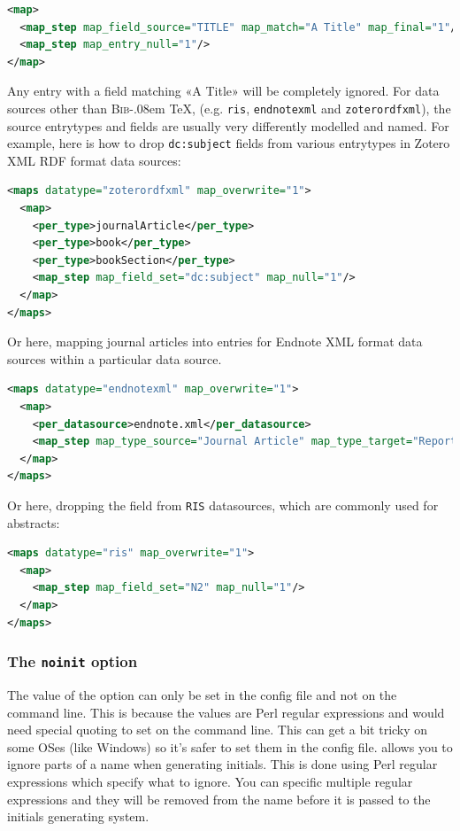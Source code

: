 \documentclass{ltxdockit}
\def\BibTeX{\textsc{Bib}\kern-.08em \TeX}
\begin{document}
\begin{lstlisting}[language=xml,escapechar=;,mathescape=true]
<map>
  <map_step map_field_source="TITLE" map_match="A Title" map_final="1"/>
  <map_step map_entry_null="1"/>
</map>
\end{lstlisting}

\noindent Any entry with a  field matching «A Title»
will be completely ignored.
\bigskip
{}
For data sources other than \BibTeX, (e.g. \verb+ris+, \verb+endnotexml+
and \verb+zoterordfxml+), the source entrytypes and fields are usually very
differently modelled and named. For example, here is how to drop
\verb+dc:subject+ fields from various entrytypes in Zotero XML RDF format data
sources:

\begin{lstlisting}[language=xml,escapechar=+,mathescape=true]
<maps datatype="zoterordfxml" map_overwrite="1">
  <map>
    <per_type>journalArticle</per_type>
    <per_type>book</per_type>
    <per_type>bookSection</per_type>
    <map_step map_field_set="dc:subject" map_null="1"/>
  </map>
</maps>
\end{lstlisting}

\noindent Or here, mapping journal articles into  entries for
Endnote XML format data sources within a particular data source.

\begin{lstlisting}[language=xml,escapechar=+,mathescape=true]
<maps datatype="endnotexml" map_overwrite="1">
  <map>
    <per_datasource>endnote.xml</per_datasource>
    <map_step map_type_source="Journal Article" map_type_target="Report"/>
  </map>
</maps>
\end{lstlisting}

\noindent Or here, dropping the  field from \verb+RIS+
datasources, which are commonly used for abstracts:

\begin{lstlisting}[language=xml,escapechar=+,mathescape=true]
<maps datatype="ris" map_overwrite="1">
  <map>
    <map_step map_field_set="N2" map_null="1"/>
  </map>
</maps>
\end{lstlisting}
\bigskip
\subsubsection{The \texttt{noinit} option}\label{noinit}

The value of the  option can only be set in the config file and
not on the command line. This is because the values are Perl regular
expressions and would need special quoting to set on the command line. This
can get a bit tricky on some OSes (like Windows) so it's safer to set them
in the config file.  allows you to ignore parts of a name when
generating initials. This is done using Perl regular expressions which
specify what to ignore. You can specific multiple regular expressions and
they will be removed from the name before it is passed to the initials
generating system.
\end{document}
